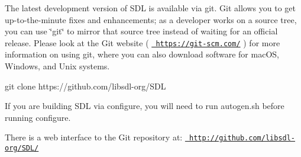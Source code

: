 The latest development version of SDL is available via git. Git allows you to get up-\/to-\/the-\/minute fixes and enhancements; as a developer works on a source tree, you can use \char`\"{}git\char`\"{} to mirror that source tree instead of waiting for an official release. Please look at the Git website ( \href{https://git-scm.com/}{\texttt{ https\+://git-\/scm.\+com/}} ) for more information on using git, where you can also download software for mac\+OS, Windows, and Unix systems. \begin{DoxyVerb}git clone https://github.com/libsdl-org/SDL
\end{DoxyVerb}
 If you are building SDL via configure, you will need to run autogen.\+sh before running configure.

There is a web interface to the Git repository at\+: \href{http://github.com/libsdl-org/SDL/}{\texttt{ http\+://github.\+com/libsdl-\/org/\+SDL/}} 